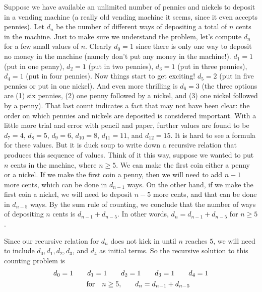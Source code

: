 \begin{exmp}
 Suppose we have available an unlimited number of
 pennies and nickels to deposit in a vending machine (a really old vending machine
 it seems, since it even accepts pennies). Let $d_n$ be the number of different
 ways of depositing a total of $n$ cents in the machine. Just to make sure we
 understand the problem, let's compute $d_n$ for a few small values of $n$. Clearly
 $d_0=1$ since there is only one way to deposit no money in the machine (namely
 don't put any money in the machine!). $d_1 = 1$ (put in one penny), $d_2=1$ (put
 in two pennies), $d_3=1$ (put in three pennies), $d_4 = 1$ (put in four
 pennies). Now things start to get exciting! $d_5= 2$ (put in five pennies or put
 in one nickel). And even more thrilling is $d_6 = 3$ (the three options are (1)
 six pennies, (2) one penny followed by a nickel, and (3) one nickel followed by a
 penny). That last count indicates a fact that may not have been clear: the order
 on which pennies and nickels are deposited is considered important. With a little
 more trial and error with pencil and paper, further values are found to be
 $d_7=4$, $d_8=5$, $d_9=6$, $d_{10}=8$, $d_{11}=11$, and $d_{12}=15$. It is hard to
 see 
 a formula for these values. But it is duck soup to write down a recursive
 relation that produces this sequence of values. Think of it this way, suppose we
 wanted to put $n$ cents in the machine, where $n\geq5$. We can make the first coin
 either a penny or a nickel. If we make the first coin a penny, then we will need
 to add $n-1$ more cents, which can be done in $d_{n-1}$ ways. On the other hand,
 if we make the first coin a nickel, we will need to deposit $n-5$ more cents, and
 that can be done in $d_{n-5}$ ways. By the sum rule of counting, we conclude that
 the number of ways of depositing $n$ cents is $d_{n-1}+d_{n-5}$. In other words, 
 $d_n = d_{n-1}+d_{n-5}$ for $n\geq 5$.
 
 Since our recursive relation for $d_n$ does  not kick in until $n$ reaches
 $5$, we will need to include $d_0, d_1, d_2, d_3$, and $d_4$ as initial terms. So
 the recursive solution to this counting problem is
 \begin{align*}
  d_0 =1\qquad d_1=1\qquad& d_2=1\qquad d_3=1\qquad d_4=1 \\
  \hbox{for}\quad n\geq5,& \qquad d_n = d_{n-1}+d_{n-5}
 \end{align*}
\end{exmp}

